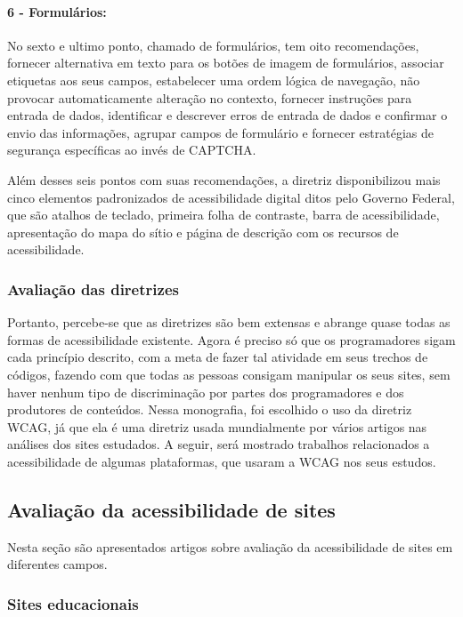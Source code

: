 \documentclass[a4paper]{article}
\begin{document}
\begin{titlepage}
\paragraph{6 - Formulários: }

No sexto e ultimo ponto, chamado de formulários, tem oito recomendações, fornecer alternativa em texto para os botões de imagem de formulários, associar etiquetas aos seus campos, estabelecer uma ordem lógica de navegação, não provocar automaticamente alteração no contexto, fornecer instruções para entrada de dados, identificar e descrever erros de entrada de dados e confirmar o envio das informações, agrupar campos de formulário e fornecer estratégias de segurança específicas ao invés de CAPTCHA.

Além desses seis pontos com suas recomendações, a diretriz disponibilizou mais cinco elementos padronizados de acessibilidade digital ditos pelo Governo Federal, que são atalhos de teclado, primeira folha de contraste, barra de acessibilidade, apresentação do mapa do sítio e página de descrição com os recursos de acessibilidade.

\subsubsection{Avaliação das diretrizes}

Portanto, percebe-se que as diretrizes são bem extensas e abrange quase todas as formas de acessibilidade existente. Agora é preciso só que os programadores sigam cada princípio descrito, com a meta de fazer tal atividade em seus trechos de códigos, fazendo com que todas as pessoas consigam manipular os seus sites, sem haver nenhum tipo de discriminação por partes dos programadores e dos produtores de conteúdos. Nessa monografia, foi escolhido o uso da diretriz WCAG, já que ela é uma diretriz usada mundialmente por vários artigos nas análises dos sites estudados. A seguir, será mostrado trabalhos relacionados a acessibilidade de algumas plataformas, que usaram a WCAG nos seus estudos.

\subsection{Avaliação da acessibilidade de sites}
Nesta seção são apresentados artigos sobre avaliação da acessibilidade de sites em diferentes campos.

\subsubsection{Sites educacionais}


\end{titlepage}
\end{document}
